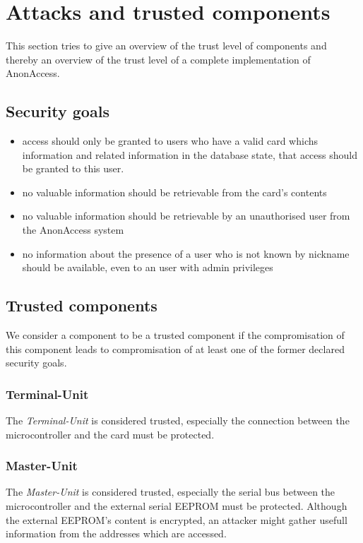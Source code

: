 \section{Attacks and trusted components}
This section tries to give an overview of the trust level of components and thereby an overview of the trust level of a complete implementation of AnonAccess.

\subsection{Security goals}
\begin{itemize}
 \item access should only be granted to users who have a valid card whichs information and related information in the database state, that access should be granted to this user.
 \item no valuable information should be retrievable from the card's contents
 \item no valuable information should be retrievable by an unauthorised user from the AnonAccess system
 \item no information about the presence of a user who is not known by nickname should be available, even to an user with admin privileges
\end{itemize}

\subsection{Trusted components}
We consider a component to be a trusted component if the compromisation of this component leads to compromisation of at least one of the former declared security goals.

\subsubsection{Terminal-Unit}
The \textit{Terminal-Unit} is considered trusted, especially the connection between the microcontroller and the card must be protected.

\subsubsection{Master-Unit}
The \textit{Master-Unit} is considered trusted, especially the serial bus between the microcontroller and the external serial EEPROM must be protected. Although the external EEPROM's content is encrypted, an attacker might gather usefull information from the addresses which are accessed.

 